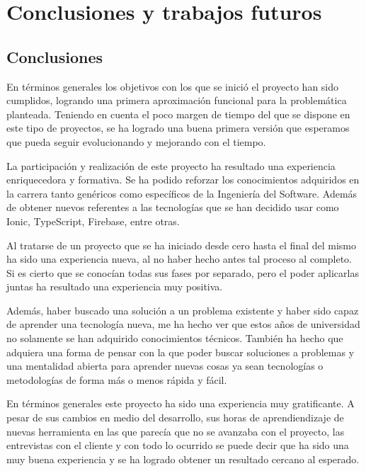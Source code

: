 \section{Conclusiones y trabajos futuros}
\subsection{Conclusiones}

En términos generales los objetivos con los que se inició el proyecto han
sido cumplidos, logrando una primera aproximación funcional para
la problemática planteada. Teniendo en cuenta el poco margen de tiempo del
que se dispone en este tipo de proyectos, se ha logrado una buena primera
versión que esperamos que pueda seguir evolucionando y mejorando con el tiempo.

\medskip
La participación y realización de este proyecto ha resultado una
experiencia enriquecedora y formativa. Se ha podido reforzar los
conocimientos adquiridos en la carrera tanto genéricos como específicos
de la Ingeniería del Software. Además de obtener nuevos referentes a
las tecnologías que se han decidido usar como Ionic, TypeScript, Firebase,
entre otras.

\medskip
Al tratarse de un proyecto que se ha iniciado desde cero hasta el final
del mismo ha sido una experiencia nueva, al no haber hecho antes
tal proceso al completo. Si es cierto que se conocían todas sus
fases por separado, pero el poder aplicarlas juntas ha resultado
una experiencia muy positiva.

\medskip
Además, haber buscado una solución a un problema
existente y haber sido capaz de aprender una tecnología nueva,
me ha hecho ver que estos años de universidad
no solamente se han adquirido conocimientos técnicos. También ha
hecho que adquiera una forma de pensar con la que poder buscar soluciones a
problemas y una mentalidad abierta para aprender nuevas cosas
ya sean tecnologías o metodologías de forma más o menos rápida y
fácil.

\medskip
En términos generales este proyecto ha sido una experiencia
muy gratificante. A pesar de sus cambios en medio del desarrollo,
sus horas de aprendiendizaje de nuevas herramienta en las que parecía que
no se avanzaba con el proyecto, las entrevistas
con el cliente y con todo lo ocurrido se puede decir que ha sido
una muy buena experiencia y se ha logrado obtener un resultado cercano al
esperado.


